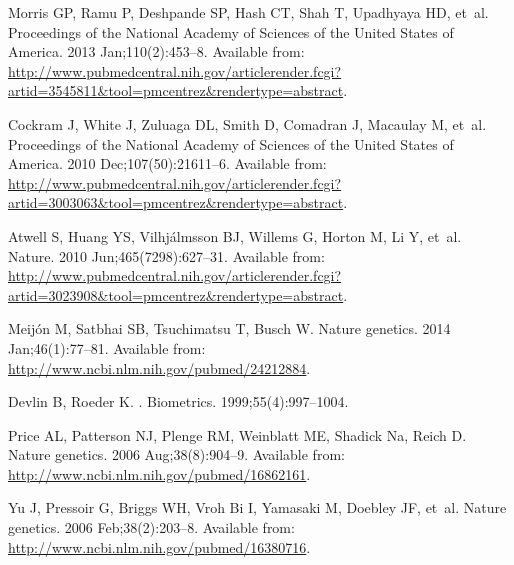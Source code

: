 \documentclass[10pt,letterpaper]{article}
\begin{document}
\begin{thebibliography}{}
Morris GP, Ramu P, Deshpande SP, Hash CT, Shah T, Upadhyaya HD, et~al.
\newblock Proceedings of the National Academy of Sciences of the United States
  of America. 2013 Jan;110(2):453--8.
\newblock Available from:
  \url{http://www.pubmedcentral.nih.gov/articlerender.fcgi?artid=3545811\&tool=pmcentrez\&rendertype=abstract}.

Cockram J, White J, Zuluaga DL, Smith D, Comadran J, Macaulay M, et~al.
\newblock Proceedings of the National Academy of Sciences of the United States
  of America. 2010 Dec;107(50):21611--6.
\newblock Available from:
  \url{http://www.pubmedcentral.nih.gov/articlerender.fcgi?artid=3003063\&tool=pmcentrez\&rendertype=abstract}.

Atwell S, Huang YS, Vilhj\'{a}lmsson BJ, Willems G, Horton M, Li Y, et~al.
\newblock Nature. 2010 Jun;465(7298):627--31.
\newblock Available from:
  \url{http://www.pubmedcentral.nih.gov/articlerender.fcgi?artid=3023908\&tool=pmcentrez\&rendertype=abstract}.

Meij\'{o}n M, Satbhai SB, Tsuchimatsu T, Busch W.
\newblock Nature genetics. 2014 Jan;46(1):77--81.
\newblock Available from: \url{http://www.ncbi.nlm.nih.gov/pubmed/24212884}.

Devlin B, Roeder K.
.
\newblock Biometrics. 1999;55(4):997--1004.

Price AL, Patterson NJ, Plenge RM, Weinblatt ME, Shadick Na, Reich D.
\newblock Nature genetics. 2006 Aug;38(8):904--9.
\newblock Available from: \url{http://www.ncbi.nlm.nih.gov/pubmed/16862161}.

Yu J, Pressoir G, Briggs WH, {Vroh Bi} I, Yamasaki M, Doebley JF, et~al.
\newblock Nature genetics. 2006 Feb;38(2):203--8.
\newblock Available from: \url{http://www.ncbi.nlm.nih.gov/pubmed/16380716}.


\end{thebibliography}
\end{document}
